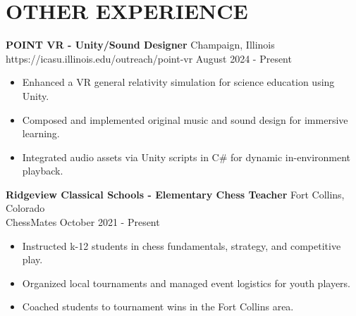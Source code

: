 \documentclass[a4paper,12pt]{extarticle}
\begin{document}
\section*{OTHER EXPERIENCE}

\noindent
\textbf{POINT VR - Unity/Sound Designer} \hspace{0.05cm}
\hfill Champaign, Illinois\\ %
https://icasu.illinois.edu/outreach/point-vr
\hfill August 2024 - Present %
\begin{itemize}[topsep=0pt]
\itemindent=-13pt
\item Enhanced a VR general relativity simulation for science education using Unity.
\item Composed and implemented original music and sound design for immersive learning.
\item Integrated audio assets via Unity scripts in C\# for dynamic in-environment playback.
\end{itemize}


\vspace{\baselineskip}
\noindent
\textbf{Ridgeview Classical Schools - Elementary Chess Teacher} \hspace{0.05cm}
\hfill Fort Collins, Colorado\\ %
ChessMates \hfill October 2021 - Present %
\begin{itemize}[topsep=0pt]
\itemindent=-13pt
\item Instructed k-12 students in chess fundamentals, strategy, and competitive play.
\item Organized local tournaments and managed event logistics for youth players.
\item Coached students to tournament wins in the Fort Collins area.
\end{itemize}





\end{document}

